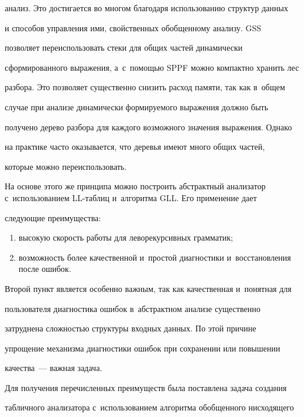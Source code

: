 анализ. Это достигается во многом благодаря использованию структур данных


и способов управления ими, свойственных обобщенному анализу. GSS


позволяет переиспользовать стеки для общих частей динамически


сформированного выражения, а~с~помощью SPPF можно компактно хранить лес


разбора. Это позволяет существенно снизить расход памяти, так как в~общем


случае при анализе динамически формируемого выражения должно быть


получено дерево разбора для каждого возможного значения выражения. Однако


на практике часто оказывается, что деревья имеют много общих частей,


которые можно переиспользовать.





На основе этого же принципа можно построить абстрактный анализатор с~использованием LL-таб\-лиц и~алгоритма GLL. Его применение дает


следующие преимущества:


\begin{enumerate}[(1)]


\item высокую скорость работы для леворекурсивных грамматик;


\item возможность более качественной и~простой диагностики и~восстановления после ошибок.


\end{enumerate}





Второй пункт является особенно важным, так как качественная и~понятная для


пользователя диагностика ошибок в~абстрактном анализе существенно


затруднена сложностью структуры входных данных. По этой причине


упрощение механизма диагностики ошибок при сохранении или повышении


качества~--- важная задача.





Для получения перечисленных преимуществ была поставлена задача создания


табличного анализатора с~использованием алгоритма обобщенного нисходящего


